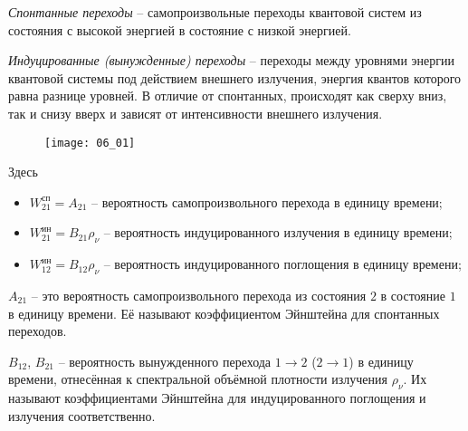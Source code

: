 

\emph{Спонтанные переходы} -- самопроизвольные переходы квантовой систем
из состояния с высокой энергией в состояние с низкой энергией.

\emph{Индуцированные (вынужденные) переходы} -- переходы между уровнями энергии
квантовой системы под действием внешнего излучения, энергия квантов которого
равна разнице уровней. В отличие от спонтанных, происходят как сверху вниз, так
и снизу вверх и зависят от интенсивности внешнего излучения.


\begin{figure}[h!]
    \center
    \texttt{[image: 06\_01]}
\end{figure}
Здесь
\begin{itemize}
    \item \( W_{21}^\text{сп} = A_{21} \) -- вероятность самопроизвольного
        перехода в единицу времени;
    \item \( W_{21}^\text{ин} = B_{21}\rho_\nu \) -- вероятность индуцированного
        излучения в единицу времени;
    \item \( W_{12}^\text{ин} = B_{12}\rho_\nu \) -- вероятность индуцированного
        поглощения в единицу времени;
\end{itemize}

\( A_{21} \) -- это вероятность самопроизвольного перехода из состояния
\( 2 \) в состояние \( 1 \) в единицу времени. Её называют коэффициентом
Эйнштейна для спонтанных переходов.

\( B_{12} \), \( B_{21} \) -- вероятность вынужденного перехода
\( 1 \rightarrow 2 \) (\( 2 \rightarrow 1 \)) в единицу времени, отнесённая к
спектральной объёмной плотности излучения \( \rho_\nu \). Их называют
коэффициентами Эйнштейна для индуцированного поглощения и излучения
соответственно.

